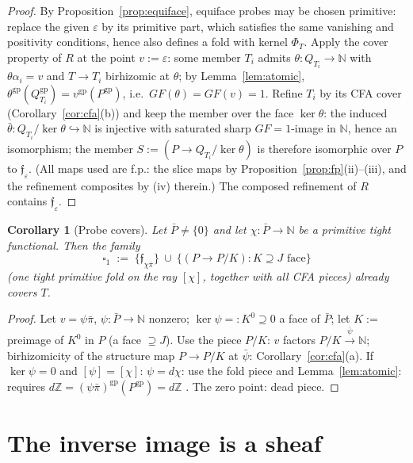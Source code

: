 \documentclass[11pt]{article}
\newtheorem{corollary}[theorem]{Corollary}
\theoremstyle{definition}
\newcommand{\gp}{\mathrm{gp}}
\newcommand{\Z}{\mathbb{Z}}
\begin{document}
\begin{proof}
By Proposition~\ref{prop:equiface}, equiface probes may be
chosen primitive: replace the given $\varepsilon$ by its
primitive part, which satisfies the same vanishing and
positivity conditions, hence also defines a fold with kernel
$\Phi_T$. Apply the cover property of $R$ at the point
$v:=\varepsilon$: some member $T_i$ admits
$\theta:Q_{T_i}\to\mathbb N$ with $\theta\alpha_i=v$ and
$T\to T_i$ birhizomic at $\theta$; by
Lemma~\ref{lem:atomic},
$\theta^{\gp}(Q_{T_i}^{\gp})=v^{\gp}(P^{\gp})$, i.e.\
${GF}(\theta)={GF}(v)=1$. Refine $T_i$ by its CFA cover
(Corollary~\ref{cor:cfa}(b)) and keep the member over the face
$\ker\theta$: the induced $\bar\theta:Q_{T_i}/\ker\theta
\hookrightarrow\mathbb N$ is injective with saturated sharp
${GF}{=}1$-image in $\mathbb N$, hence an isomorphism; the
member $S:=(P\to Q_{T_i}/\ker\theta)$ is therefore isomorphic
over $P$ to $\mathfrak f_\varepsilon$.
\textup{(}All maps used are f.p.: the slice maps by
Proposition~\ref{prop:fp}(ii)--(iii), and the refinement
composites by (iv) therein.\textup{)}
The composed refinement of
$R$ contains $\mathfrak f_\varepsilon$.
\end{proof}

\begin{corollary}[Probe covers]\label{cor:probecovers}
Let $\bar P\ne\{0\}$ and let $\chi:\bar P\to\mathbb N$ be a primitive
tight functional. Then the family
\[
\square_1\;:=\;\{\mathfrak f_{\chi\bar\pi}\}\ \cup\
\{(P\to P/K):K\supseteq J\text{ face}\}
\]
\textup{(}one tight primitive fold on the ray $[\chi]$, together with
all CFA pieces\textup{)} already covers $T$.
\end{corollary}

\begin{proof}
Let $v=\psi\bar\pi$, $\psi:\bar P\to\mathbb N$ nonzero;
$\ker\psi=:K^0\supseteq0$ a face of $\bar P$; let
$K:=$ preimage of $K^0$ in $P$ (a face $\supseteq J$). Use the piece
$P/K$: $v$ factors $P/K\xrightarrow{\bar\psi}\mathbb N$;
birhizomicity of the structure map $P\to P/K$ at $\bar\psi$:
Corollary~\ref{cor:cfa}(a). If $\ker\psi=0$ and $[\psi]=[\chi]$:
$\psi=d\chi$: use the fold piece and Lemma~\ref{lem:atomic}:
requires $d\Z=(\psi\bar\pi)^{\gp}(P^{\gp})=d\Z$ \checkmark. The zero point:
dead piece.
\end{proof}


\section{The inverse image is a sheaf}\label{sec:sheaf}
\end{document}
